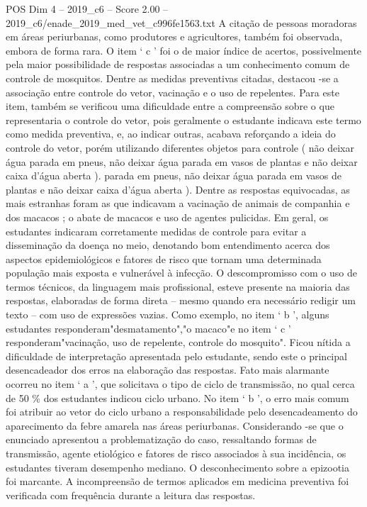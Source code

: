 \begin{textsample}{POS Dim 4 – 2019\_c6 – Score 2.00 – 2019\_c6/enade\_2019\_med\_vet\_c996fe1563.txt}
A citação de pessoas moradoras em áreas periurbanas, como produtores e agricultores, também foi observada, embora de forma rara.
O item ‘ c ’ foi o de maior índice de acertos, possivelmente pela maior possibilidade de respostas associadas a um conhecimento comum de controle de mosquitos.
Dentre as medidas preventivas citadas, destacou -se a associação entre controle do vetor, vacinação e o uso de repelentes.
Para este item, também se verificou uma dificuldade entre a compreensão sobre o que representaria o controle do vetor, pois geralmente o estudante indicava este termo como medida preventiva, e, ao indicar outras, acabava reforçando a ideia do controle do vetor, porém utilizando diferentes objetos para controle ( não deixar água parada em pneus, não deixar água parada em vasos de plantas e não deixar caixa d’água aberta ). parada em pneus, não deixar água parada em vasos de plantas e não deixar caixa d’água aberta ).
Dentre as respostas equivocadas, as mais estranhas foram as que indicavam a vacinação de animais de companhia e dos macacos ; o abate de macacos e uso de agentes pulicidas.
Em geral, os estudantes indicaram corretamente medidas de controle para evitar a disseminação da doença no meio, denotando bom entendimento acerca dos aspectos epidemiológicos e fatores de risco que tornam uma determinada população mais exposta e vulnerável à infecção.
O descompromisso com o uso de termos técnicos, da linguagem mais profissional, esteve presente na maioria das respostas, elaboradas de forma direta – mesmo quando era necessário redigir um texto – com uso de expressões vazias.
Como exemplo, no item ‘ b ’, alguns estudantes responderam"desmatamento","o macaco"e no item ‘ c ’ responderam"vacinação, uso de repelente, controle do mosquito".
Ficou nítida a dificuldade de interpretação apresentada pelo estudante, sendo este o principal desencadeador dos erros na elaboração das respostas.
Fato mais alarmante ocorreu no item ‘ a ’, que solicitava o tipo de ciclo de transmissão, no qual cerca de 50 \% dos estudantes indicou ciclo urbano.
No item ‘ b ’, o erro mais comum foi atribuir ao vetor do ciclo urbano a responsabilidade pelo desencadeamento do aparecimento da febre amarela nas áreas periurbanas.
Considerando -se que o enunciado apresentou a problematização do caso, ressaltando formas de transmissão, agente etiológico e fatores de risco associados à sua incidência, os estudantes tiveram desempenho mediano.
O desconhecimento sobre a epizootia foi marcante.
A incompreensão de termos aplicados em medicina preventiva foi verificada com frequência durante a leitura das respostas.

\end{textsample}
